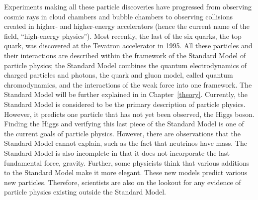 Experiments making all these particle discoveries 
have progressed from observing cosmic rays 
in cloud chambers and bubble chambers 
to observing collisions created in higher- and higher-energy 
accelerators 
(hence the current name of the field, 
``high-energy physics'').  
Most recently, the last of the six quarks, the top quark, 
was discovered at the Tevatron accelerator in 1995.  
All these particles and their interactions are described 
within the framework of the Standard Model of particle physics; 
the Standard Model combines the quantum electrodynamics 
of charged particles and photons, the quark and gluon model, 
called quantum chromodynamics, 
and the interactions of the weak force into one framework.  
The Standard Model will be further explained in 
in Chapter~\ref{theory}. 
Currently, the Standard Model is considered to be the 
primary description of particle physics.  
However, it predicts one particle that has not yet been 
observed, the Higgs boson.  
Finding the Higgs and verifying this last piece 
of the Standard Model 
is one of the current goals of 
particle physics.  
However, there are observations that 
the Standard Model cannot explain, 
such as the fact that neutrinos have mass.  
The Standard Model is also incomplete in that 
it does not incorporate the last fundamental force, gravity.  
Further, some physicists think that various additions 
to the Standard Model make it more elegant.  
These new models predict various new particles.  
Therefore, scientists are also on the lookout 
for any evidence of particle physics existing 
outside the Standard Model.  




